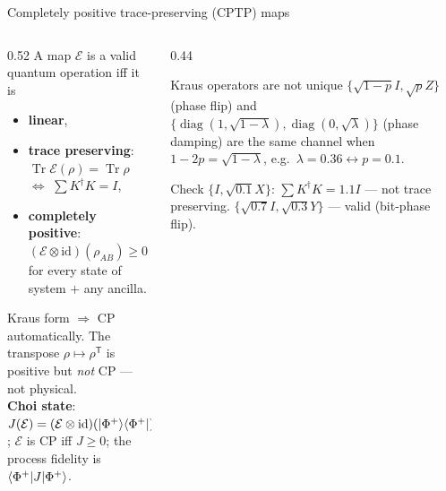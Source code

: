 \documentclass[aspectratio=169,11pt]{beamer}
\newcommand{\key}[1]{{\color{qdark}\textbf{#1}}}
\newcommand{\E}{\mathcal E}
\begin{document}
\begin{frame}[label=fCPTP]{Completely positive trace-preserving (CPTP) maps}
  \begin{columns}[T]
    \begin{column}{0.52\textwidth}
      \small
      A map $\E$ is a valid quantum operation iff it is
      \begin{itemize}\itemsep1pt
        \item \key{linear},
        \item \key{trace preserving}: $\operatorname{Tr}\E(\rho) = \operatorname{Tr}\rho$ $\Leftrightarrow$ $\sum K^\dagger K = I$,
        \item \key{completely positive}: $(\E\otimes\mathrm{id})(\rho_{AB}) \ge 0$ for every state of system $+$ any ancilla.
      \end{itemize}
      Kraus form $\Rightarrow$ CP automatically. The transpose $\rho \mapsto \rho^{\mathsf T}$ is positive but \emph{not} CP --- not physical.\\[3pt]
      \key{Choi state}: $J(\E) = (\E\otimes\mathrm{id})(\ket{\Phi^+}\!\bra{\Phi^+})$; $\E$ is CP iff $J \ge 0$; the process fidelity is $\braket{\Phi^+|J|\Phi^+}$.
    \end{column}
    \begin{column}{0.44\textwidth}
      \begin{block}{Kraus operators are not unique}
        \scriptsize $\{\sqrt{1-p}I, \sqrt pZ\}$ (phase flip) and $\{\operatorname{diag}(1, \sqrt{1-\lambda}), \operatorname{diag}(0, \sqrt\lambda)\}$ (phase damping) are the
        same channel when $1 - 2p = \sqrt{1-\lambda}$, e.g.\ $\lambda = 0.36 \leftrightarrow p = 0.1$.
      \end{block}
      \begin{alertblock}{Check}
        \scriptsize $\{I, \sqrt{0.1}X\}$: $\sum K^\dagger K = 1.1I$ --- not trace preserving.
        $\{\sqrt{0.7}I, \sqrt{0.3}Y\}$ --- valid (bit-phase flip).
      \end{alertblock}
    \end{column}
  \end{columns}
\end{frame}

\end{document}
